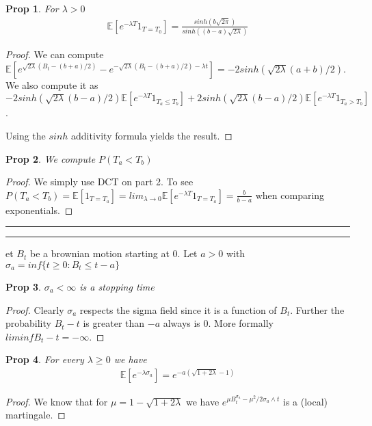 \documentclass[11pt]{article}
\newcommand{\E}{\mathbb{E}}
\newcommand{\question}[2] {\vspace{.25in} \hrule\vspace{0.5em}
\noindent{\bf #1: #2} \vspace{0.5em}
\hrule \vspace{.10in}}
\newtheorem{prop}{Prop}
\begin{document}
\begin{prop}
	For $\lambda > 0$ 
	\begin{align*}
		\E[e^{-\lambda T}1_{T=T_0}] = \frac{sinh(b\sqrt{2\pi})}{sinh((b-a)\sqrt{2\lambda})}
	\end{align*}
\end{prop}

\begin{proof}
	We can compute $\E[e^{\sqrt{2 \lambda}(B_t - (b+a)/2)} - e^{-\sqrt{2 \lambda}(B_t - (b+a)/2)-\lambda t}] = -2sinh(\sqrt{2\lambda} (a+b)/2)$. We also compute it as $-2sinh(\sqrt{2\lambda} (b-a)/2)\E[e^{-\lambda T}1_{T_a \leq T_b}] + 2 sinh(\sqrt{2 \lambda} (b-a)/2)\E[e^{-\lambda T}1_{T_a > T_b}]$. 

	Using the $sinh$ additivity formula yields the result. 
\end{proof}

\begin{prop}
	We compute $P(T_a < T_b)$ 
\end{prop}

\begin{proof}
	We simply use DCT on part 2. To see
	$P(T_a < T_b) = \E[1_{T=T_a}] = lim_{\lambda \to 0} \E[e^{-\lambda T} 1_{T = T_a}] = \frac{b}{b-a}$ when comparing exponentials. 
\end{proof}

\question{Question 18}

Let $B_t$ be a brownian motion starting at 0. Let $a > 0$ with $\sigma_a = inf\{t \geq 0 : B_t \leq t -a\}$

\begin{prop}
	$\sigma_a < \infty$ is a stopping time
\end{prop}

\begin{proof}
	Clearly $\sigma_a$ respects the sigma field since it is a function of $B_t$. Further the probability $B_t -t$ is greater than $-a$ always is 0. More formally $liminf B_t -t = -\infty$. 
\end{proof}

\begin{prop}
	For every $\lambda \geq 0$ we have
	\begin{align*}
		\E[e^{-\lambda \sigma_a}] = e^{-a(\sqrt{1+2\lambda}-1)}
	\end{align*}
\end{prop}

\begin{proof}
	We know that for $\mu =  1 - \sqrt{1+2 \lambda}$ we have $e^{\mu B_t^{\sigma_a} - \mu^2/2 \sigma_a \wedge t}$ is a (local) martingale.
\end{proof}
\end{document}
